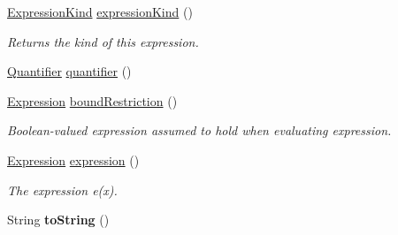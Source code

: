 \begin{DoxyCompactItemize}
\item 
\hyperlink{enumedu_1_1udel_1_1cis_1_1vsl_1_1civl_1_1model_1_1IF_1_1expression_1_1Expression_1_1ExpressionKind}{Expression\+Kind} \hyperlink{classedu_1_1udel_1_1cis_1_1vsl_1_1civl_1_1model_1_1common_1_1expression_1_1CommonQuantifiedExpression_aa7b33d27acdeadf4bdeabee3e141d9c1}{expression\+Kind} ()
\begin{DoxyCompactList}\small\item\em Returns the kind of this expression. \end{DoxyCompactList}\item 
\hyperlink{enumedu_1_1udel_1_1cis_1_1vsl_1_1civl_1_1model_1_1IF_1_1expression_1_1QuantifiedExpression_1_1Quantifier}{Quantifier} \hyperlink{classedu_1_1udel_1_1cis_1_1vsl_1_1civl_1_1model_1_1common_1_1expression_1_1CommonQuantifiedExpression_ad6fb2b93eaf17b7007314451fdb209d5}{quantifier} ()
\item 
\hyperlink{interfaceedu_1_1udel_1_1cis_1_1vsl_1_1civl_1_1model_1_1IF_1_1expression_1_1Expression}{Expression} \hyperlink{classedu_1_1udel_1_1cis_1_1vsl_1_1civl_1_1model_1_1common_1_1expression_1_1CommonQuantifiedExpression_a38334c015cfd850c69d3af1c9a84de81}{bound\+Restriction} ()
\begin{DoxyCompactList}\small\item\em Boolean-\/valued expression assumed to hold when evaluating expression. \end{DoxyCompactList}\item 
\hyperlink{interfaceedu_1_1udel_1_1cis_1_1vsl_1_1civl_1_1model_1_1IF_1_1expression_1_1Expression}{Expression} \hyperlink{classedu_1_1udel_1_1cis_1_1vsl_1_1civl_1_1model_1_1common_1_1expression_1_1CommonQuantifiedExpression_a0d50da53d541203d956f7989a968c1af}{expression} ()
\begin{DoxyCompactList}\small\item\em The expression e(x). \end{DoxyCompactList}\item 
\hypertarget{classedu_1_1udel_1_1cis_1_1vsl_1_1civl_1_1model_1_1common_1_1expression_1_1CommonQuantifiedExpression_a10111acc2d54448e8703c0703dc14f5e}{}String {\bfseries to\+String} ()\label{classedu_1_1udel_1_1cis_1_1vsl_1_1civl_1_1model_1_1common_1_1expression_1_1CommonQuantifiedExpression_a10111acc2d54448e8703c0703dc14f5e}


\end{DoxyCompactItemize}
